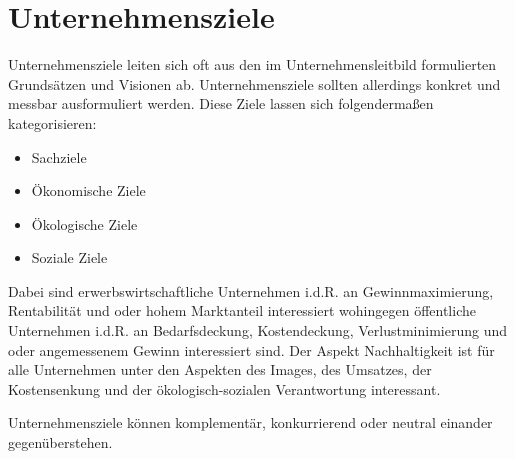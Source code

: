 \section{Unternehmensziele}

Unternehmensziele leiten sich oft aus den im Unternehmensleitbild formulierten Grundsätzen und Visionen ab. Unternehmensziele sollten allerdings konkret und messbar ausformuliert werden. Diese Ziele lassen sich folgendermaßen kategorisieren:

\begin{itemize}
    \item Sachziele
    \item Ökonomische Ziele
    \item Ökologische Ziele
    \item Soziale Ziele
\end{itemize}

Dabei sind erwerbswirtschaftliche Unternehmen i.d.R. an Gewinnmaximierung, Rentabilität und oder hohem Marktanteil interessiert wohingegen öffentliche Unternehmen i.d.R. an Bedarfsdeckung, Kostendeckung, Verlustminimierung und oder angemessenem Gewinn interessiert sind. Der Aspekt Nachhaltigkeit ist für alle Unternehmen unter den Aspekten des Images, des Umsatzes, der Kostensenkung und der ökologisch-sozialen Verantwortung interessant.

Unternehmensziele können komplementär, konkurrierend oder neutral einander gegenüberstehen.